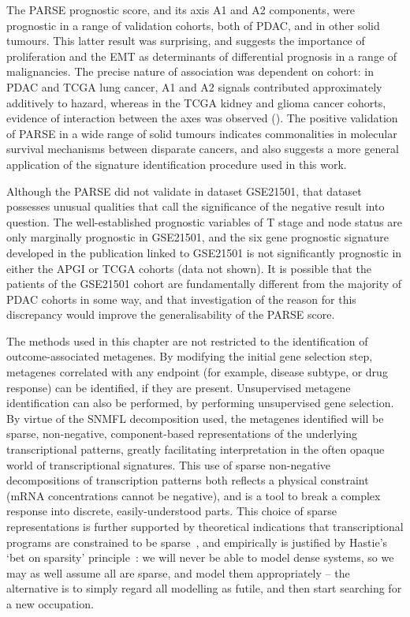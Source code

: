 \documentclass[dissertation.tex]{subfiles}
\begin{document}
The \gls{PARSE} prognostic score, and its axis A1 and A2 components, were prognostic in a range of validation cohorts, both of \gls{PDAC}, and in other solid tumours.  This latter result was surprising, and suggests the importance of proliferation and the \gls{EMT} as determinants of differential prognosis in a range of malignancies.  The precise nature of association was dependent on cohort: in \gls{PDAC} and \gls{TCGA} lung cancer, A1 and A2 signals contributed approximately additively to hazard, whereas in the \gls{TCGA} kidney and glioma cancer cohorts, evidence of interaction between the axes was observed ().  The positive validation of \gls{PARSE} in a wide range of solid tumours indicates commonalities in molecular survival mechanisms between disparate cancers, and also suggests a more general application of the signature identification procedure used in this work.

Although the \gls{PARSE} did not validate in dataset GSE21501, that dataset possesses unusual qualities that call the significance of the negative result into question.  The well-established prognostic variables of T stage and node status are only marginally prognostic in GSE21501, and the six gene prognostic signature developed in the publication linked to GSE21501 \cite{Stratford2010} is not significantly prognostic in either the \gls{APGI} or \gls{TCGA} cohorts (data not shown).  It is possible that the  patients of the GSE21501 cohort are fundamentally different from the majority of \gls{PDAC} cohorts in some way, and that investigation of the reason for this discrepancy would improve the generalisability of the \gls{PARSE} score.

The methods used in this chapter are not restricted to the identification of outcome-associated metagenes.  By modifying the initial gene selection step, metagenes correlated with any endpoint (for example, disease subtype, or drug response) can be identified, if they are present.  Unsupervised metagene identification can also be performed, by performing unsupervised gene selection.  By virtue of the \gls{SNMFL} decomposition used, the metagenes identified will be sparse, non-negative, component-based representations of the underlying transcriptional patterns, greatly facilitating interpretation in the often opaque world of transcriptional signatures.  This use of sparse non-negative decompositions of transcription patterns both reflects a physical constraint (mRNA concentrations cannot be negative), and is a tool to break a complex response into discrete, easily-understood parts.  This choice of sparse representations is further supported by theoretical indications that transcriptional programs are constrained to be sparse~\cite{Leclerc2008}, and empirically is justified by Hastie's `bet on sparsity' principle~\cite{Hastie01statisticallearning}: we will never be able to model dense systems, so we may as well assume all are sparse, and model them appropriately -- the alternative is to simply regard all modelling as futile, and then start searching for a new occupation.
\end{document}
